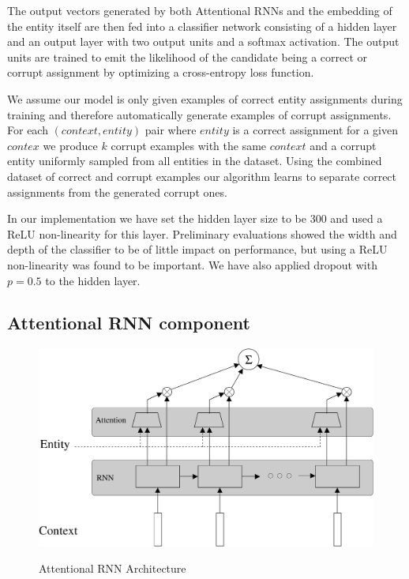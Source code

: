 \documentclass[11pt]{article}
\begin{document}
The output vectors generated by both Attentional RNNs and the embedding of the entity itself are then fed into a classifier network consisting of a hidden layer and an output layer with two output units and a softmax activation. The output units are trained to emit the likelihood of the candidate being a correct or corrupt assignment by optimizing a cross-entropy loss function. 

We assume our model is only given examples of correct entity assignments during training and therefore automatically generate examples of corrupt assignments. For each $(context,entity)$ pair where $entity$ is a correct assignment for a given $contex$ we produce $k$ corrupt examples with the same $context$ and a corrupt entity uniformly sampled from all entities in the dataset. Using the combined dataset of correct and corrupt examples our algorithm learns to separate correct assignments from the generated corrupt ones.

In our implementation we have set the hidden layer size to be 300 and used a ReLU non-linearity for this layer. Preliminary evaluations showed the width and depth of the classifier to be of little impact on performance, but using a ReLU non-linearity was found to be important. We have also applied dropout with $p=0.5$ to the hidden layer.

\subsection{Attentional RNN component}

\begin{figure}
	\centering 
	\caption{Attentional RNN Architecture}
	\includegraphics[scale=0.25]{diagrams/RNN_ATTN.pdf}
	\label{fig:arnn}
\end{figure}	
\end{document}
